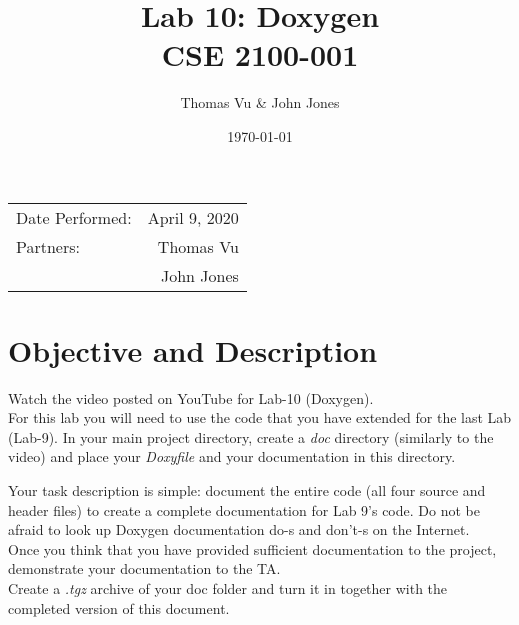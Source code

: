 \documentclass{article}
\title{Lab 10: Doxygen\\ CSE 2100-001} %
\author{Thomas Vu & John Jones} %
\date{\today} %
\begin{document}
\maketitle %

\begin{center}
\begin{tabular}{l r}
Date Performed: & April 9, 2020 \\ %
Partners: & Thomas Vu \\ %
& John Jones \\
\end{tabular}
\end{center}



\section{Objective and Description}

Watch the video posted on YouTube for Lab-10 (Doxygen). \\

For this lab you will need to use the code that you have extended for the last Lab (Lab-9). In your main project directory, create a \textit{doc} directory (similarly to the video) and place your \textit{Doxyfile} and your documentation in this directory. 

Your task description is simple: document the entire code (all four source and header files) to create a complete documentation for Lab 9's code. Do not be afraid to look up Doxygen documentation do-s and don't-s on the Internet.\\ 

Once you think that you have provided sufficient documentation to the project, demonstrate your documentation to the TA.\\

Create a \textit{.tgz} archive of your doc folder and turn it in together with the completed version of this document. 
\end{document}
